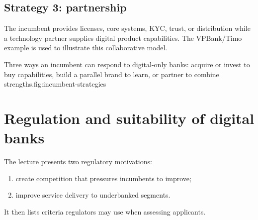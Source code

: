 \subsection{Strategy 3: partnership}

The incumbent provides licenses, core systems, KYC, trust, or distribution while a technology partner supplies digital product capabilities. The VPBank/Timo example is used to illustrate this collaborative model.

\begin{utpfig}{Three ways an incumbent can respond to digital-only banks: acquire or invest to buy capabilities, build a parallel brand to learn, or partner to combine strengths.}{fig:incumbent-strategies}
\end{utpfig}

\section{Regulation and suitability of digital banks}

The lecture presents two regulatory motivations:

\begin{enumerate}
  \item create competition that pressures incumbents to improve;
  \item improve service delivery to underbanked segments.
\end{enumerate}

It then lists criteria regulators may use when assessing applicants.

